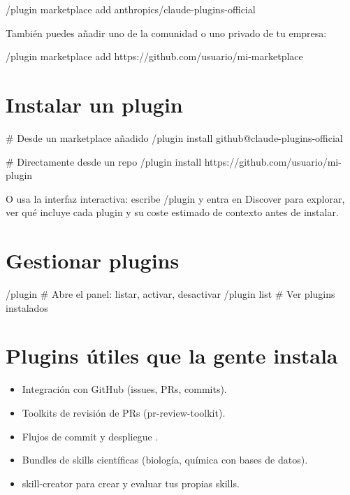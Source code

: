 \documentclass[11pt,a4paper]{book}
\begin{document}
\begin{codebox}
/plugin marketplace add anthropics/claude-plugins-official
\end{codebox}
También puedes añadir uno de la comunidad o uno privado de tu empresa:

\begin{codebox}
/plugin marketplace add https://github.com/usuario/mi-marketplace
\end{codebox}
\section{Instalar un plugin}
\begin{codebox}
# Desde un marketplace añadido
/plugin install github@claude-plugins-official

# Directamente desde un repo
/plugin install https://github.com/usuario/mi-plugin
\end{codebox}
O usa la interfaz interactiva: escribe /plugin y entra en Discover para explorar, ver qué incluye cada plugin y su coste estimado de contexto antes de instalar.

\section{Gestionar plugins}
\begin{codebox}
/plugin           # Abre el panel: listar, activar, desactivar
/plugin list      # Ver plugins instalados
\end{codebox}
\section{Plugins útiles que la gente instala}
\begin{itemize}\item Integración con GitHub (issues, PRs, commits).\end{itemize}
\begin{itemize}\item Toolkits de revisión de PRs (pr-review-toolkit).\end{itemize}
\begin{itemize}\item Flujos de commit y despliegue .\end{itemize}
\begin{itemize}\item Bundles de skills científicas (biología, química con bases de datos).\end{itemize}
\begin{itemize}\item skill-creator para crear y evaluar tus propias skills.\end{itemize}
\end{document}
